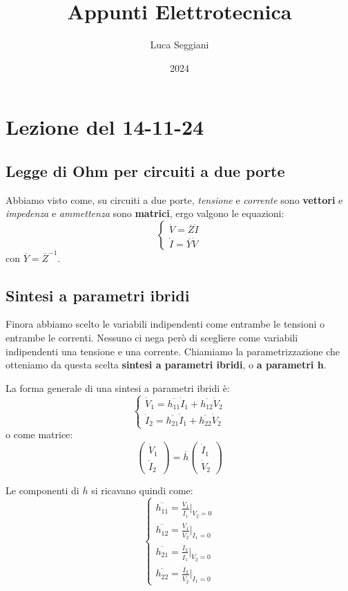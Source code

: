 \documentclass[a4paper,11pt]{article}
\title{Appunti Elettrotecnica}
\author{Luca Seggiani}
\date{2024}
\begin{document}
\section{Lezione del 14-11-24}

\thispagestyle{empty}
\pagestyle{fancy}

\subsection{Legge di Ohm per circuiti a due porte}
Abbiamo visto come, su circuiti a due porte, \textit{tensione} e \textit{corrente} sono \textbf{vettori} e \textit{impedenza} e \textit{ammettenza} sono \textbf{matrici}, ergo valgono le equazioni:
\[
	\begin{cases}
		\dot{V} = \overline{Z} \dot{I} \\ 
		\dot{I} = \overline{Y} \dot{V}
	\end{cases}
\]
con $\overline{Y} = \overline{Z}^{-1}$. 

\subsection{Sintesi a parametri ibridi}
Finora abbiamo scelto le variabili indipendenti come entrambe le tensioni o entrambe le correnti. 
Nessuno ci nega però di scegliere come variabili indipendenti una tensione e una corrente.
Chiamiamo la parametrizzazione che otteniamo da questa scelta \textbf{sintesi a parametri ibridi}, o \textbf{a parametri h}.

La forma generale di una sintesi a parametri ibridi è:
\[
	\begin{cases}
		\dot{V}_1 = \overline{h_{11}} \dot{I}_1 + \overline{h_{12}} \dot{V}_2 \\ 
		\dot{I}_2 = \overline{h_{21}} \dot{I}_1 + \overline{h_{22}} \dot{V}_2
	\end{cases}
\]
o come matrice:
$$
\begin{pmatrix}
	\dot{V}_1 \\ \dot{I}_2
\end{pmatrix}
= \overline{h}
\begin{pmatrix}
	\dot{I}_1 \\ \dot{V}_2
\end{pmatrix}
$$

Le componenti di $\overline{h}$ si ricavano quindi come:
\[
	\begin{cases}
		\overline{h_{11}} = \frac{\dot{V}_1}{\dot{I}_1} \Big|_{\dot{V}_2 = 0} \\
		\overline{h_{12}} = \frac{\dot{V}_1}{\dot{V}_2} \Big|_{\dot{I}_1 = 0} \\
		\overline{h_{21}} = \frac{\dot{I}_2}{\dot{I}_1} \Big|_{\dot{V}_2 = 0} \\
		\overline{h_{22}} = \frac{\dot{I}_2}{\dot{V}_2} \Big|_{\dot{I}_1 = 0}
	\end{cases}
\]
\end{document}
